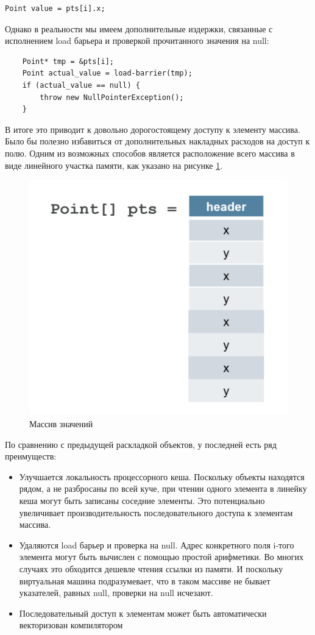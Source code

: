 \begin{lstlisting}
Point value = pts[i].x;
\end{lstlisting}
Однако в реальности мы имеем дополнительные издержки, связанные с исполнением load барьера и проверкой прочитанного значения на null:
\begin{lstlisting}
	Point* tmp = &pts[i];
	Point actual_value = load-barrier(tmp);
	if (actual_value == null) {
		throw new NullPointerException();
	}
\end{lstlisting}
В итоге это приводит к довольно дорогостоящему доступу к элементу массива. Было бы полезно избавиться от дополнительных накладных расходов на доступ к полю. Одним из возможных способов является расположение всего массива в виде линейного участка памяти, как указано на рисунке \ref{values-graph}.

\begin{figure}[h]
	\includegraphics[width=0.65\linewidth]{image/flattened-points.png}
	\caption{Массив значений}\label{values-graph}
\end{figure}
По сравнению с предыдущей раскладкой объектов, у последней есть ряд преимуществ:
\begin{itemize}
	\item Улучшается локальность процессорного кеша. Поскольку объекты находятся рядом, а не разбросаны по всей куче, при чтении одного элемента в линейку кеша могут быть записаны соседние элементы. Это потенциально увеличивает производительность последовательного доступа к элементам массива.
	\item Удаляются load барьер и проверка на null. Адрес конкретного поля i-того элемента могут быть вычислен с помощью простой арифметики. Во многих случаях это обходится дешевле чтения ссылки из памяти. И поскольку виртуальная машина подразумевает, что в таком массиве не бывает указателей, равных null, проверки на null исчезают.
	\item Последовательный доступ к элементам может быть автоматически векторизован компилятором
\end{itemize}
